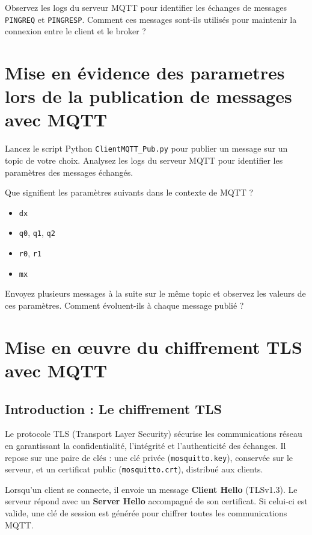 \documentclass{article}
\begin{document}
Observez les logs du serveur MQTT pour identifier les échanges de messages \texttt{PINGREQ} et \texttt{PINGRESP}. Comment ces messages sont-ils utilisés pour maintenir la connexion entre le client et le broker ?

\section{Mise en évidence des parametres lors de la publication de messages avec MQTT}

Lancez le script Python \texttt{ClientMQTT\_Pub.py} pour publier un message sur un topic de votre choix. Analysez les logs du serveur MQTT pour identifier les paramètres des messages échangés.

Que signifient les paramètres suivants dans le contexte de MQTT ?

\begin{itemize}
    \item \texttt{dx}
    \item \texttt{q0}, \texttt{q1}, \texttt{q2}
    \item \texttt{r0}, \texttt{r1}
    \item \texttt{mx}
\end{itemize}

Envoyez plusieurs messages à la suite sur le même topic et observez les valeurs de ces paramètres. Comment évoluent-ils à chaque message publié ?

\section{Mise en œuvre du chiffrement TLS avec MQTT}

\subsection{Introduction : Le chiffrement TLS}

Le protocole TLS (Transport Layer Security) sécurise les communications réseau en garantissant la confidentialité, l'intégrité et l'authenticité des échanges. Il repose sur une paire de clés : une clé privée (\texttt{mosquitto.key}), conservée sur le serveur, et un certificat public (\texttt{mosquitto.crt}), distribué aux clients.

Lorsqu'un client se connecte, il envoie un message \textbf{Client Hello} (TLSv1.3). Le serveur répond avec un \textbf{Server Hello} accompagné de son certificat. Si celui-ci est valide, une clé de session est générée pour chiffrer toutes les communications MQTT.
\end{document}
